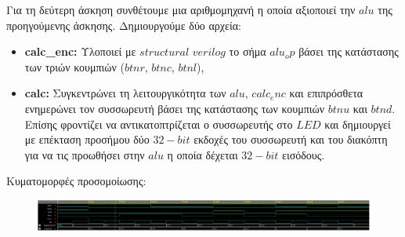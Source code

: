 Για τη δεύτερη άσκηση συνθέτουμε μια αριθμομηχανή η οποία αξιοποιεί την $alu$ της
προηγούμενης άσκησης. Δημιουργούμε δύο αρχεία:
\begin{itemize}
    \item {}\textbf{calc\_enc:} Υλοποιεί με $structural$ $verilog$ το σήμα $alu_op$ βάσει 
    της κατάστασης των τριών κουμπιών ($btnr$, $btnc$, $btnl$), 
    \item {}\textbf{calc:} Συγκεντρώνει τη λειτουργικότητα των $alu$, $calc_enc$ και 
    επιπρόσθετα ενημερώνει τον συσσωρευτή βάσει της κατάστασης των κουμπιών $btnu$ και $btnd$.
    Επίσης φροντίζει να αντικατοπτρίζεται ο συσσωρευτής στο $LED$ και δημιουργεί με επέκταση 
    προσήμου δύο $32-bit$ εκδοχές του συσσωρευτή και του διακόπτη για να τις προωθήσει στην
    $alu$ η οποία δέχεται $32-bit$ εισόδους.
\end{itemize}

Κυματομορφές προσομοίωσης:
\begin{figure}[H]
    \centering
    \includegraphics[width=1\textwidth]{media/exercise2_waveforms.png}
\end{figure}